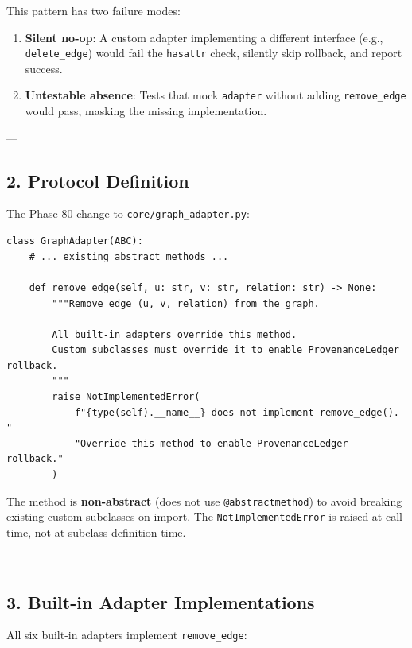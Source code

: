 This pattern has two failure modes:
\begin{enumerate}
\item \textbf{Silent no-op}: A custom adapter imple\-menting a different interface (e.g., \texttt{delete\_edge}) would fail the \texttt{hasattr} check, silently skip rollback, and report success.
\item \textbf{Untestable absence}: Tests that mock \texttt{adapter} without adding \texttt{remove\_edge} would pass, masking the missing imple\-mentation.

\end{enumerate}
---

\subsection{2. Protocol Definition}

The Phase 80 change to \texttt{core/graph\_adapter.py}:

\begin{lstlisting}
class GraphAdapter(ABC):
    # ... existing abstract methods ...

    def remove_edge(self, u: str, v: str, relation: str) -> None:
        """Remove edge (u, v, relation) from the graph.

        All built-in adapters override this method.
        Custom subclasses must override it to enable ProvenanceLedger rollback.
        """
        raise NotImplementedError(
            f"{type(self).__name__} does not implement remove_edge(). "
            "Override this method to enable ProvenanceLedger rollback."
        )
\end{lstlisting}

The method is \textbf{non-abstract} (does not use \texttt{@abstractmethod}) to avoid breaking existing custom subclasses on import. The \texttt{NotImplementedError} is raised at call time, not at subclass definition time.

---

\subsection{3. Built-in Adapter Implem\-entations}

All six built-in adapters implement \texttt{remove\_edge}:

